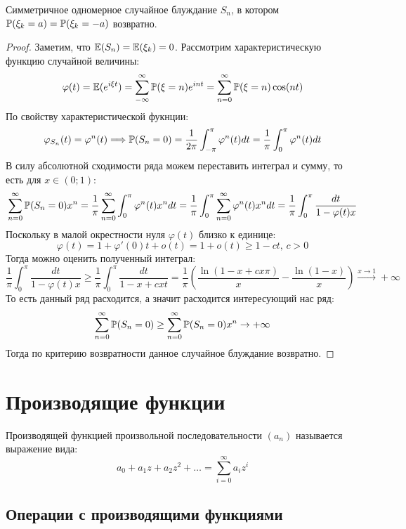 \documentclass[12pt]{article}
\begin{document}
\begin{theorem}
    Симметричное одномерное случайное блуждание $S_n$, в котором $\mathbb{P}(\xi_k=a)=\mathbb{P}(\xi_k=-a)$ возвратно.
\end{theorem}
\begin{proof}
    Заметим, что $\mathbb{E}(S_n)=\mathbb{E}(\xi_k)=0$. Рассмотрим характеристическую функцию случайной величины:
    $$\varphi(t)=\mathbb{E}(e^{i\xi t})=\sum_{-\infty}^{\infty}\mathbb{P}(\xi=n)e^{int}=\sum_{n=0}^{\infty}\mathbb{P}(\xi=n)\cos(nt)$$
    По свойству характеристической фукнции:
    $$\varphi_{S_n}(t)=\varphi^n(t)\Longrightarrow \mathbb{P}(S_n=0)=\frac{1}{2\pi}\int_{-\pi}^{\pi}\varphi^n(t)dt=\frac{1}{\pi}\int_{0}^{\pi}\varphi^n(t)dt$$
    В силу абсолютной сходимости ряда можем переставить интеграл и сумму, то есть для $x\in(0;1)$:
    $$\sum_{n=0}^{\infty}\mathbb{P}(S_n=0)x^n=\frac{1}{\pi}\sum_{n=0}^{\infty}\int_{0}^{\pi}\varphi^n(t)x^ndt=\frac{1}{\pi}\int_{0}^{\pi}\sum_{n=0}^{\infty}\varphi^n(t)x^ndt=\frac{1}{\pi}\int_{0}^{\pi}\frac{dt}{1-\varphi(t)x}$$
    Поскольку в малой окрестности нуля $\varphi(t)$ близко к единице:
    $$\varphi(t)=1+\varphi'(0)t+o(t)=1+o(t)\geq 1-ct,\, c>0$$
    Тогда можно оценить полученный интеграл:
    $$\frac{1}{\pi}\int_{0}^{\pi}\frac{dt}{1-\varphi(t)x}\geq \frac{1}{\pi}\int_{0}^{\pi}\frac{dt}{1-x+cxt}=\frac{1}{\pi}\left(\frac{\ln(1-x+cx\pi)}{x}-\frac{\ln(1-x)}{x}\right)\xrightarrow{x\to1}+\infty$$
    То есть данный ряд расходится, а значит расходится интересующий нас ряд:
    $$\sum_{n=0}^{\infty}\mathbb{P}(S_n=0)\geq\sum_{n=0}^{\infty}\mathbb{P}(S_n=0)x^n\to+\infty$$
    Тогда по критерию возвратности данное случайное блуждание возвратно.
\end{proof}

\section{Производящие функции}

\begin{definition}
    Производящей функцией произвольной последовательности $(a_n)$ называется выражение вида:
    $$a_0+a_1z+a_2z^2+\ldots=\sum_{i=0}^{\infty}a_iz^i$$
\end{definition}

\subsection{Операции с производящими функциями}
\end{document}
